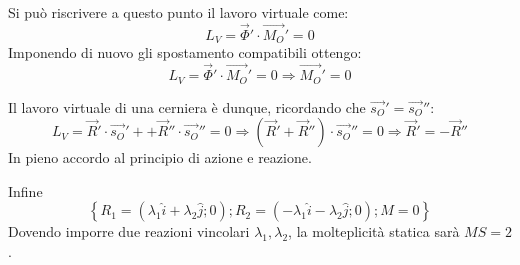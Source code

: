 \documentclass{article}
\begin{document}
\begin{adjustwidth}{2in}{}
\begin{enumerate}
			Si può riscrivere a questo punto il lavoro virtuale come:
			\[
			L_{V} = \vec{\Phi}' \cdot \vec{M_O}' = 0
			\]
			Imponendo di nuovo gli spostamento compatibili ottengo:  \[L_{V} = \vec{\Phi}' \cdot \vec{M_O}' = 0 \Rightarrow \vec{M_O}' = 0 \]
			
			Il lavoro virtuale di una cerniera è dunque, ricordando che $\vec{s_O}' = \vec{s_O}''$: 
			\[
			L_{V} = \vec{R}' \cdot \vec{s_O}'+ + \vec{R}'' \cdot \vec{s_O}'' = 0 \Rightarrow (\vec{R}' + \vec{R}'') \cdot \vec{s_O}'' = 0 \Rightarrow \vec{R}' = - \vec{R}''
			\]
			In pieno accordo al principio di azione e reazione. 
			
			Infine 
			\[
			\left\lbrace R_1 = (\lambda_1 \hat{i} + \lambda_2 \hat{j}; 0); R_2 = (-\lambda_1 \hat{i} - \lambda_2 \hat{j}; 0); M=0\right\rbrace 
			\]
			Dovendo imporre due reazioni vincolari $\lambda_1, \lambda_2$, la molteplicità statica sarà $MS = 2$. \newpage
			

\end{enumerate}
\end{adjustwidth}
\end{document}
